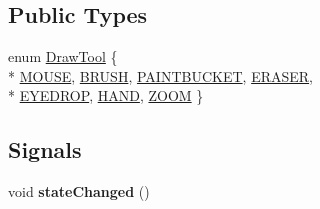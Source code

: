 \subsection*{Public Types}
\begin{DoxyCompactItemize}
\item 
enum \hyperlink{classGLWidget_a9fba3eba78950865febd4547be0641d0}{Draw\-Tool} \{ \\*
\hyperlink{classGLWidget_a9fba3eba78950865febd4547be0641d0a53197083abb268d80465c7af0071bfe7}{M\-O\-U\-S\-E}, 
\hyperlink{classGLWidget_a9fba3eba78950865febd4547be0641d0a13dba4ab40790d00786f83a8af372a37}{B\-R\-U\-S\-H}, 
\hyperlink{classGLWidget_a9fba3eba78950865febd4547be0641d0aa9321e588f178276ed181cc2ffa44dbc}{P\-A\-I\-N\-T\-B\-U\-C\-K\-E\-T}, 
\hyperlink{classGLWidget_a9fba3eba78950865febd4547be0641d0a36a243e579dcf431ca1bf5306f9b3459}{E\-R\-A\-S\-E\-R}, 
\\*
\hyperlink{classGLWidget_a9fba3eba78950865febd4547be0641d0ab9c3b71d6caf455913325367c4d00862}{E\-Y\-E\-D\-R\-O\-P}, 
\hyperlink{classGLWidget_a9fba3eba78950865febd4547be0641d0ab807fc933b2f87fde055dd12b61a9ec2}{H\-A\-N\-D}, 
\hyperlink{classGLWidget_a9fba3eba78950865febd4547be0641d0a28331a2b609c88af7845259f23271151}{Z\-O\-O\-M}
 \}
\end{DoxyCompactItemize}
\subsection*{Signals}
\begin{DoxyCompactItemize}
\item 
\hypertarget{classGLWidget_a4a11176bfcdf51d04a18d4383bde7a58}{void {\bfseries state\-Changed} ()}\label{classGLWidget_a4a11176bfcdf51d04a18d4383bde7a58}

\end{DoxyCompactItemize}
